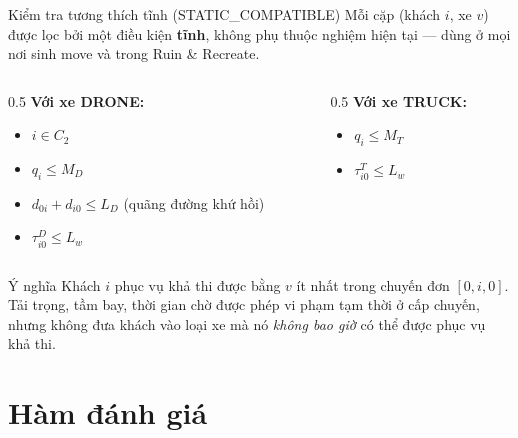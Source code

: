 \documentclass[aspectratio=169]{beamer}
\newcommand{\hl}[1]{\textcolor{blue!60!black}{\textbf{#1}}}
\begin{document}
\begin{frame}{Kiểm tra tương thích tĩnh (STATIC\_COMPATIBLE)}
  \small Mỗi cặp (khách $i$, xe $v$) được lọc bởi một điều kiện \hl{tĩnh}, không phụ thuộc nghiệm hiện tại — dùng ở mọi nơi sinh move và trong Ruin \& Recreate.

  \begin{columns}[T]
    \begin{column}{0.5\textwidth}
      \textbf{Với xe DRONE:}
      \begin{itemize}
        \item \small $i \in C_2$
        \item \small $q_i \le M_D$
        \item \small $d_{0i} + d_{i0} \le L_D$ (quãng đường khứ hồi)
        \item \small $\tau^{D}_{i0} \le L_w$
      \end{itemize}
    \end{column}
    \begin{column}{0.5\textwidth}
      \textbf{Với xe TRUCK:}
      \begin{itemize}
        \item \small $q_i \le M_T$
        \item \small $\tau^{T}_{i0} \le L_w$
      \end{itemize}
    \end{column}
  \end{columns}

  \vspace{2mm}
  \begin{alertblock}{Ý nghĩa}
    \small Khách $i$ phục vụ khả thi được bằng $v$ ít nhất trong chuyến đơn $[0,i,0]$. Tải trọng, tầm bay, thời gian chờ được phép vi phạm tạm thời ở cấp chuyến, nhưng không đưa khách vào loại xe mà nó \emph{không bao giờ} có thể được phục vụ khả thi.
  \end{alertblock}
\end{frame}

\section{Hàm đánh giá}
\end{document}
